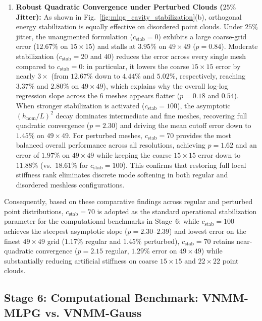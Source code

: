 \documentclass[preprint,12pt]{elsarticle}
\begin{document}
\begin{enumerate}
    \item \textbf{Robust Quadratic Convergence under Perturbed Clouds ($25\%$ Jitter):} As shown in Fig.~\ref{fig:mlpg_cavity_stabilization}(b), orthogonal energy stabilization is equally effective on disordered point clouds. Under $25\%$ jitter, the unaugmented formulation ($c_{\mathrm{stab}} = 0$) exhibits a large coarse-grid error ($12.67\%$ on $15\times 15$) and stalls at $3.95\%$ on $49 \times 49$ ($p = 0.84$). Moderate stabilization ($c_{\mathrm{stab}} = 20$ and $40$) reduces the error across every single mesh compared to $c_{\mathrm{stab}} = 0$: in particular, it lowers the coarse $15\times 15$ error by nearly $3\times$ (from $12.67\%$ down to $4.44\%$ and $5.02\%$, respectively, reaching $3.37\%$ and $2.80\%$ on $49\times 49$), which explains why the overall log-log regression slope across the 6 meshes appears flatter ($p = 0.18$ and $0.54$). When stronger stabilization is activated ($c_{\mathrm{stab}} = 100$), the asymptotic $(h_{\mathrm{nom}}/L)^2$ decay dominates intermediate and fine meshes, recovering full quadratic convergence ($p = 2.30$) and driving the mean cutoff error down to $\mathbf{1.45\%}$ on $49 \times 49$. For perturbed meshes, $c_{\mathrm{stab}} = 70$ provides the most balanced overall performance across all resolutions, achieving $p = 1.62$ and an error of $1.97\%$ on $49 \times 49$ while keeping the coarse $15 \times 15$ error down to $11.88\%$ (vs.\ $18.61\%$ for $c_{\mathrm{stab}} = 100$). This confirms that restoring full local stiffness rank eliminates discrete mode softening in both regular and disordered meshless configurations.
\end{enumerate}

Consequently, based on these comparative findings across regular and perturbed point distributions, $c_{\mathrm{stab}} = 70$ is adopted as the standard operational stabilization parameter for the computational benchmarks in Stage~6: while $c_{\mathrm{stab}} = 100$ achieves the steepest asymptotic slope ($p = 2.30\text{--}2.39$) and lowest error on the finest $49\times 49$ grid ($1.17\%$ regular and $1.45\%$ perturbed), $c_{\mathrm{stab}} = 70$ retains near-quadratic convergence ($p = 2.15$ regular, $1.29\%$ error on $49\times 49$) while substantially reducing artificial stiffness on coarse $15\times 15$ and $22\times 22$ point clouds.

\subsection{Stage 6: Computational Benchmark: VNMM-MLPG vs. VNMM-Gauss}
\label{subsec:stage6_benchmark}
\end{document}
